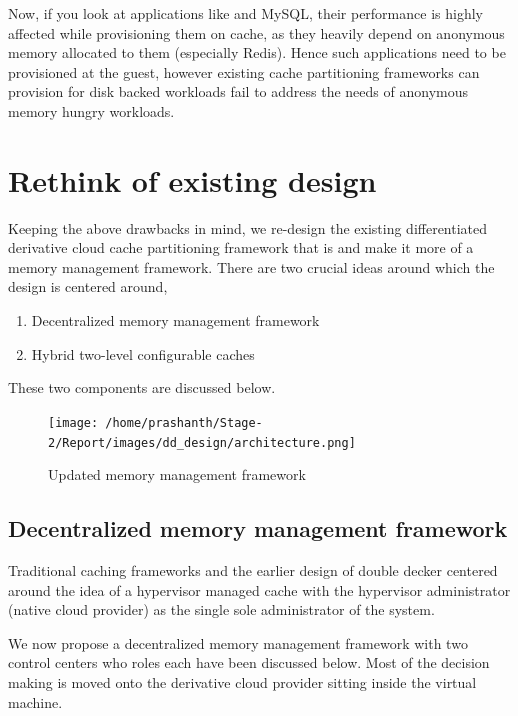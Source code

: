 	  Now, if you look at applications like \redis{} and MySQL, their performance is highly affected while provisioning
	  them on cache, as they heavily depend on anonymous memory allocated to them (especially Redis). Hence such applications
	  need to be provisioned at the guest, however existing cache partitioning frameworks 
	  \cite{koller2015centaur, schopp2006resizing} can provision for disk backed workloads fail to address the needs of 
	  anonymous memory hungry workloads.
	    

  \section{Rethink of existing design}
    
    Keeping the above drawbacks in mind, we re-design the existing differentiated derivative cloud cache partitioning
    framework that \dd{} is and make it more of a memory management framework. There are two crucial ideas around which
    the design is centered around,
    
    \begin{enumerate}
      \item Decentralized memory management framework
      \item Hybrid two-level configurable caches
    \end{enumerate}
    
    \noindent These two components are discussed below.
  
    \begin{figure}
      \centering
      \texttt{[image: /home/prashanth/Stage-2/Report/images/dd\_design/architecture.png]}
      \caption{Updated memory management framework}
      \label{plot:dd_architecture}
    \end{figure}
        
    \subsection{Decentralized memory management framework}
      Traditional caching frameworks and the earlier design of double decker centered around the idea 
      of a hypervisor managed cache with the hypervisor administrator (native cloud provider) as the single sole 
      administrator of the system.
      
      We now propose a decentralized memory management framework with two control centers 
      who roles each have been discussed below. Most of the decision making is moved onto the
      derivative cloud provider sitting inside the virtual machine.
	      
